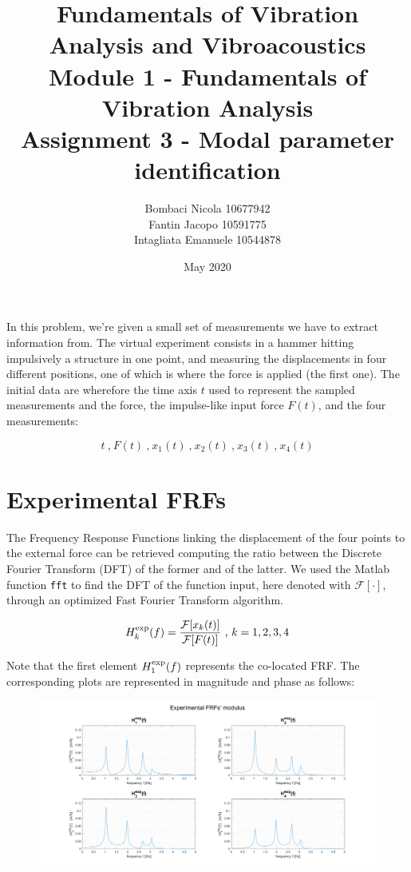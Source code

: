 \documentclass[a4paper,12pt,oneside]{article}
\title{Fundamentals of Vibration Analysis and Vibroacoustics \\
Module 1 - Fundamentals of Vibration Analysis \\
Assignment 3 - Modal parameter identification}
\author{Bombaci Nicola 10677942 \\
Fantin Jacopo 10591775 \\
Intagliata Emanuele 10544878}
\date{May 2020}
\begin{document}
\maketitle

\vspace{100pt}

In this problem, we're given a small set of measurements we have to extract information from. The virtual experiment consists in a hammer hitting impulsively a structure in one point, and measuring the displacements in four different positions, one of which is where the force is applied (the first one). The initial data are wherefore the time axis $ t $ used to represent the sampled measurements and the force, the impulse-like input force $ F(t) $, and the four measurements:

\[
	t ~ \text{,} ~ F(t) ~ \text{,} ~
		x_1(t) ~ \text{,} ~ x_2(t) ~ \text{,} ~ x_3(t) ~ \text{,} ~ x_4(t)
\]

\section{Experimental FRFs}
\label{sec:experimental_frfs}

The Frequency Response Functions linking the displacement of the four points to the external force can be retrieved computing the ratio between the Discrete Fourier Transform (DFT) of the former and of the latter. We used the Matlab function \lstinline!fft! to find the DFT of the function input, here denoted with $ \mathcal{F[\cdot]} $, through an optimized Fast Fourier Transform algorithm.


\[
	H^\textup{exp}_k(f) = \frac{\mathcal{F}[x_k(t)]}{\mathcal{F}[F(t)]}
		~ \text{,} ~ k = 1,2,3,4
\]

Note that the first element $ H^\textup{exp}_1(f) $ represents the co-located FRF. The corresponding plots are represented in magnitude and phase as follows:

\begin{figure}[H]
	\hspace{-70pt}
	\includegraphics[scale=0.4]{experimental_frfs_modulus}
\end{figure}
\end{document}
